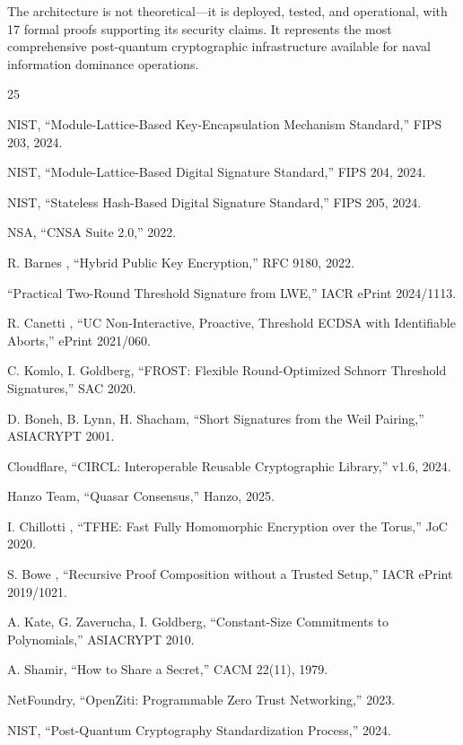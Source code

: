 \documentclass[11pt,letterpaper]{article}
\begin{document}
The architecture is not theoretical---it is deployed, tested, and operational, with 17 formal proofs supporting its security claims. It represents the most comprehensive post-quantum cryptographic infrastructure available for naval information dominance operations.

\begin{thebibliography}{25}

 NIST, ``Module-Lattice-Based Key-Encapsulation Mechanism Standard,'' FIPS 203, 2024.

 NIST, ``Module-Lattice-Based Digital Signature Standard,'' FIPS 204, 2024.

 NIST, ``Stateless Hash-Based Digital Signature Standard,'' FIPS 205, 2024.

 NSA, ``CNSA Suite 2.0,'' 2022.

 R. Barnes \etal, ``Hybrid Public Key Encryption,'' RFC 9180, 2022.

 ``Practical Two-Round Threshold Signature from LWE,'' IACR ePrint 2024/1113.

 R. Canetti \etal, ``UC Non-Interactive, Proactive, Threshold ECDSA with Identifiable Aborts,'' ePrint 2021/060.

 C. Komlo, I. Goldberg, ``FROST: Flexible Round-Optimized Schnorr Threshold Signatures,'' SAC 2020.

 D. Boneh, B. Lynn, H. Shacham, ``Short Signatures from the Weil Pairing,'' ASIACRYPT 2001.

 Cloudflare, ``CIRCL: Interoperable Reusable Cryptographic Library,'' v1.6, 2024.

 Hanzo Team, ``Quasar Consensus,'' Hanzo, 2025.

 I. Chillotti \etal, ``TFHE: Fast Fully Homomorphic Encryption over the Torus,'' JoC 2020.

 S. Bowe \etal, ``Recursive Proof Composition without a Trusted Setup,'' IACR ePrint 2019/1021.

 A. Kate, G. Zaverucha, I. Goldberg, ``Constant-Size Commitments to Polynomials,'' ASIACRYPT 2010.

 A. Shamir, ``How to Share a Secret,'' CACM 22(11), 1979.

 NetFoundry, ``OpenZiti: Programmable Zero Trust Networking,'' 2023.

 NIST, ``Post-Quantum Cryptography Standardization Process,'' 2024.

\end{thebibliography}
\end{document}
